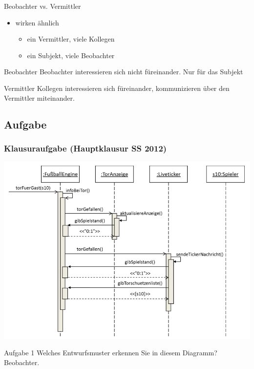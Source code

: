 \documentclass[18pt]{beamer}
\begin{document}
\begin{frame}{Beobachter vs. Vermittler}
	\begin{itemize}
	\item wirken ähnlich
	\begin{itemize}
	\item ein Vermittler, viele Kollegen
	\item ein Subjekt, viele Beobachter
	\end{itemize}
	\end{itemize}
	\pause
	\begin{block}{Beobachter}
	Beobachter interessieren sich nicht füreinander. Nur für das Subjekt
	\end{block}
	\begin{block}{Vermittler}
	Kollegen interessieren sich füreinander, kommunizieren über den Vermittler miteinander.
	\end{block}
\end{frame}

\subsection{Aufgabe}
	\begin{frame}
	\frametitle{Klausuraufgabe (Hauptklausur SS 2012)}
	\includegraphics[scale=0.35]{./pics/tut3/obs-task.png}	
	\begin{block}{Aufgabe 1}
	Welches Entwurfsmuster erkennen Sie in diesem Diagramm? \pause
	Beobachter.
	\end{block}
\end{frame}
\end{document}
